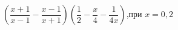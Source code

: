 \begin{ex}[type=simplify_calculate]
	\begin{condition}
		\( \left( \dfrac{x+1}{x-1}-\dfrac{x-1}{x+1} \right)\left( \dfrac{1}{2}-\dfrac{x}{4}-\dfrac{1}{4x} \right) \),\quad при \( x=0,2 \)
	\end{condition}
\end{ex}